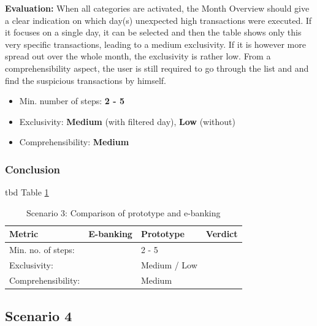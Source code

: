 \textbf{Evaluation:} When all categories are activated, the Month Overview should give a clear indication on which day(s) unexpected high transactions were executed. If it focuses on a single day, it can be selected and then the table shows only this very specific transactions, leading to a medium exclusivity. If it is however more spread out over the whole month, the exclusivity is rather low. From a comprehensibility aspect, the user is still required to go through the list and and find the suspicious transactions by himself.
\begin{itemize}[noitemsep,nolistsep]
	\item Min. number of steps: \textbf{2 - 5}
	\item Exclusivity: \textbf{Medium} (with filtered day), \textbf{Low} (without)
	\item Comprehensibility: \textbf{Medium}
\end{itemize}



\subsubsection{Conclusion}

tbd Table \ref{tbl:scenariothreecomparison}

\begin{table}[t]
	\begin{center}
		\begin{tabular}{ | p{3.5cm} | p{3cm} | p{3cm} | p{3cm} | } 
			\hline
			\textbf{Metric} & \textbf{E-banking} & \textbf{Prototype} & \textbf{Verdict} \\
			\hline
			Min. no. of steps: &  & 2 - 5 &  \\
			\hline
			Exclusivity: &  & Medium / Low &  \\
			\hline
			Comprehensibility: &  & Medium &  \\
			\hline
		\end{tabular}
		\caption{Scenario 3: Comparison of prototype and e-banking}
		\label{tbl:scenariothreecomparison}
	\end{center}
\end{table}



\subsection{Scenario 4}

